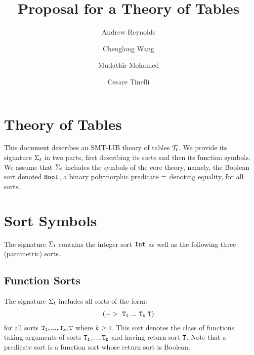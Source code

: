 \documentclass[english,a4paper,10pt]{article}
\begin{document}
\title{Proposal for a Theory of Tables}

\author{Andrew Reynolds \and Chenglong Wang \and Mudathir Mohamed \and Cesare Tinelli}

\maketitle



\section{Theory of Tables}

This document describes an SMT-LIB theory of tables $\mathcal{T}_{t}$.
We provide its signature $\Sigma_{t}$ in two parts,
first describing its sorts and then its function symbols.
We assume that $\Sigma_{t}$ includes the symbols of the core theory, 
namely, the Boolean sort denoted ${\tt Bool}$,
a binary polymorphic predicate ${\tt =}$ denoting equality, for all sorts.

\section{Sort Symbols}

The signature $\Sigma_{t}$ contains 
the integer sort ${\tt Int}$ as well as
the following three (parametric) sorts.

\subsection{Function Sorts}
The signature $\Sigma_{t}$ includes all sorts of the form:
\begin{align*}
{\tt (->\ T_1\ ...\ T_k\ T)}
\end{align*}
for all sorts ${\tt T_1, ..., T_k, T}$ where $k \geq 1$.
This sort denotes the class of functions taking arguments of sorts ${\tt T_1, ..., T_k}$
and having return sort ${\tt T}$.
Note that a predicate sort is a function sort whose return
sort is Boolean.

\begin{comment}
\paragraph{Notes}
\begin{itemize}
\item The term $\syntax{ 
(lambda\ ((x_1\ T_1)\ ...\ (x_n\ T_n))\ t)
}$
has sort 
$\syntax{(->\ T_1\ ...\ T_n\ T)}$
when $\syntax{t}$ has sort $\syntax{T}$.
\end{itemize}
\end{comment}
\end{document}
